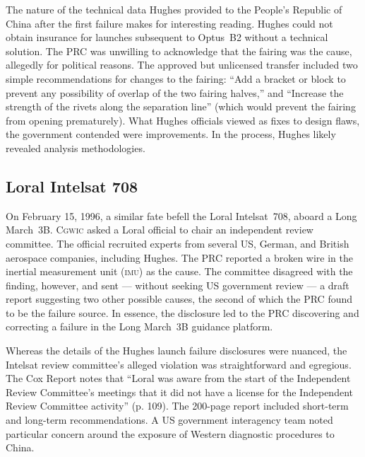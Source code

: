 \documentclass[12pt]{olfmemo}
\begin{document}
The nature of the technical data Hughes provided to the People's Republic of China after the first failure makes for interesting reading. Hughes could not obtain insurance for launches subsequent to Optus~B2 without a technical solution. The PRC was unwilling to acknowledge that the fairing was the cause, allegedly for political reasons. The approved but unlicensed transfer included two simple recommendations for changes to the fairing: ``Add a bracket or block to prevent any possibility of overlap of the two fairing halves,'' and ``Increase the strength of the rivets along the separation line'' (which would prevent the fairing from opening prematurely). What Hughes officials viewed as fixes to design flaws, the government contended were improvements. In the process, Hughes likely revealed analysis methodologies. \citep{Cox1999} %

\subsection{Loral Intelsat 708}
On February 15, 1996, a similar fate befell the Loral Intelsat~708, aboard a Long March~3B. \textsc{Cgwic} asked a Loral official to chair an independent review committee. The official recruited experts from several US, German, and British aerospace companies, including Hughes. The PRC reported a broken wire in the inertial measurement unit (\textsc{imu}) as the cause. The committee disagreed with the finding, however, and sent --- without seeking US government review --- a draft report suggesting two other possible causes, the second of which the PRC found to be the failure source. In essence, the disclosure led to the PRC discovering and correcting a failure in the Long March~3B guidance platform. \citep{Cox1999}

Whereas the details of the Hughes launch failure disclosures were nuanced, the Intelsat review committee's alleged violation was straightforward and egregious. The Cox Report notes that ``Loral was aware from the start of the Independent Review Committee's meetings that it did not have a license for the Independent Review Committee activity'' (p. 109). The 200-page report included short-term and long-term recommendations. A US government interagency team noted particular concern around the exposure of Western diagnostic procedures to China. \citep{Cox1999}
\end{document}
